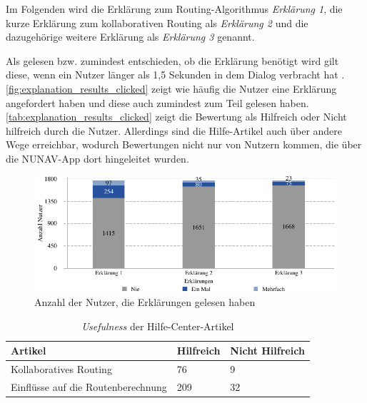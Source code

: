 Im Folgenden wird die Erklärung zum Routing-Algorithmus \textit{Erklärung 1}, die kurze Erklärung zum kollaborativen Routing als \textit{Erklärung 2} und die dazugehörige weitere Erklärung als \textit{Erklärung 3} genannt.

Als gelesen bzw. zumindest entschieden, ob die Erklärung benötigt wird gilt diese, wenn ein Nutzer länger als 1,5 Sekunden in dem Dialog verbracht hat \cite{BAHR2011776}. \autoref{fig:explanation_results_clicked} zeigt wie häufig die Nutzer eine Erklärung angefordert haben und diese auch zumindest zum Teil gelesen haben. \autoref{tab:explanation_results_clicked} zeigt die Bewertung als \glqq Hilfreich\grqq{} oder \glqq Nicht hilfreich\grqq{} durch die Nutzer. Allerdings sind die Hilfe-Artikel auch über andere Wege erreichbar, wodurch Bewertungen nicht nur von Nutzern kommen, die über die NUNAV-App dort hingeleitet wurden.

\begin{figure}[htb!]
    \centering
    \includegraphics[width=\textwidth]{contents/06_model_evaluation/02_evaluation/res/explanation_results_clicked.pdf}
    \caption{Anzahl der Nutzer, die Erklärungen gelesen haben}
    \label{fig:explanation_results_clicked}
\end{figure}

\begin{table}[htb!]
    \centering
    \begin{tabular}{p{}p{}p{}}
        \hline
        Artikel & Hilfreich & Nicht Hilfreich \\
        \toprule
        Kollaboratives Routing & 76 & 9 \\
        Einflüsse auf die Routenberechnung & 209 & 32 \\
        \bottomrule
    \end{tabular}
    \caption{\textit{Usefulness} der Hilfe-Center-Artikel}
    \label{tab:explanation_results_clicked}
\end{table}

